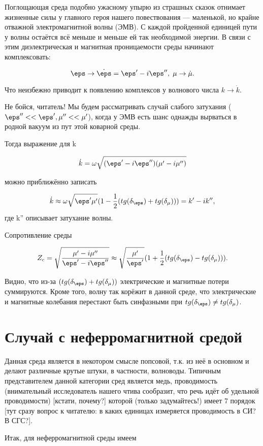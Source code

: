 Поглощающая среда подобно ужасному упырю из страшных сказок отнимает жизненные силы у главного героя
нашего повествования --- маленькой, но 
крайне отважной электромагнитной волны (ЭМВ). С каждой пройденной единицей пути у волны остаётся всё меньше и меньше
ей так необходимой энергии. В связи с этим диэлектрическая и магнитная проницаемости среды начинают комплексовать:

$$\eps \to \dot{\eps} = \eps'-i\eps'', \; \mu \to \dot{\mu}. $$

Что неизбежно приводит к появлению комплексов у волнового числа $k \to \dot{k}$.


Не бойся, читатель! Мы будем рассматривать случай слабого затухания ($\eps''<<\eps', \mu''<< \mu'$), когда 
 у ЭМВ есть шанс однажды вырваться в родной вакуум из пут этой коварной среды.


Тогда выражение для k 

$$\dot{k}=\omega \sqrt{(\eps'-i\eps'')(\mu'-i\mu'')} $$

можно приближённо записать

$$\dot{k} \approx \omega \sqrt{\eps'\mu'}(1-\frac{1}{2}(tg(\delta_{\eps})+tg(\delta_{\mu})))=k'-ik'', $$
где k'' описывает затухание волны.

Сопротивление среды 

$$Z_c=\sqrt{\frac{\mu'-i\mu''}{\eps'-i\eps''}} 
\approx \sqrt{\frac{\mu'}{\eps'}}(1+\frac{1}{2}(tg(\delta_{\eps})-tg(\delta_{\mu}))). $$

Видно, что из-за $(tg(\delta_{\eps})+tg(\delta_{\mu}))$ электрические и магнитные
потери суммируются. Кроме того, волну так корёжит в данной среде, что электрические и магнитные колебания
перестают быть синфазными при $tg(\delta_{\eps}) \ne tg(\delta_{\mu})$.

\section{Случай с неферромагнитной средой}

Данная среда является в некотором смысле попсовой, т.к. из неё в основном и делают различные 
крутые штуки, в частности, волноводы. Типичным представителем данной категории сред является медь, 
проводимость (внимательный исследователь нашего чтива сообразит, что речь идёт об удельной проводимости)
[кстати, почему?] которой (только задумайтесь!) имеет 7 порядок [тут сразу вопрос к читателю:
в каких единицах измеряется проводимость в СИ? В СГС?].


Итак, для неферромагнитной среды имеем

